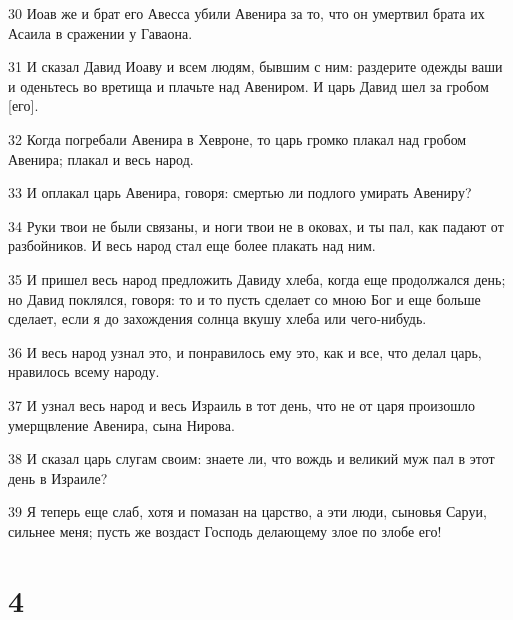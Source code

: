 \par 30 Иоав же и брат его Авесса убили Авенира за то, что он умертвил брата их Асаила в сражении у Гаваона.
\par 31 И сказал Давид Иоаву и всем людям, бывшим с ним: раздерите одежды ваши и оденьтесь во вретища и плачьте над Авениром. И царь Давид шел за гробом [его].
\par 32 Когда погребали Авенира в Хевроне, то царь громко плакал над гробом Авенира; плакал и весь народ.
\par 33 И оплакал царь Авенира, говоря: смертью ли подлого умирать Авениру?
\par 34 Руки твои не были связаны, и ноги твои не в оковах, и ты пал, как падают от разбойников. И весь народ стал еще более плакать над ним.
\par 35 И пришел весь народ предложить Давиду хлеба, когда еще продолжался день; но Давид поклялся, говоря: то и то пусть сделает со мною Бог и еще больше сделает, если я до захождения солнца вкушу хлеба или чего-нибудь.
\par 36 И весь народ узнал это, и понравилось ему это, как и все, что делал царь, нравилось всему народу.
\par 37 И узнал весь народ и весь Израиль в тот день, что не от царя произошло умерщвление Авенира, сына Нирова.
\par 38 И сказал царь слугам своим: знаете ли, что вождь и великий муж пал в этот день в Израиле?
\par 39 Я теперь еще слаб, хотя и помазан на царство, а эти люди, сыновья Саруи, сильнее меня; пусть же воздаст Господь делающему злое по злобе его!

\chapter{4}

